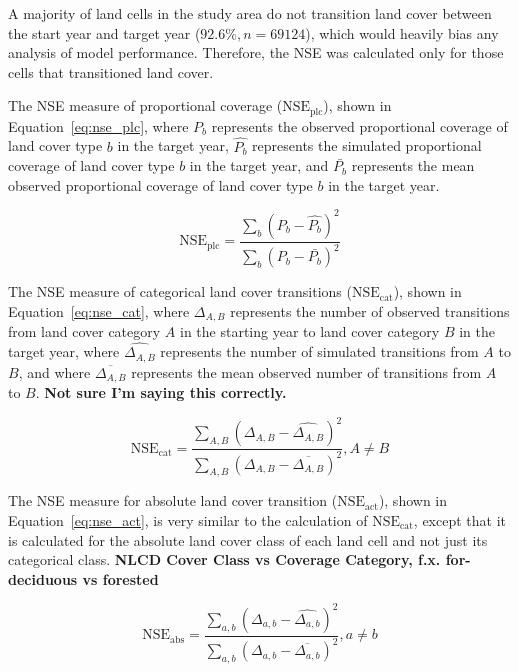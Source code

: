 A majority of land cells in the study area do not transition land cover
between the start year and target year ($92.6\%, n=69124$),
which would heavily bias any analysis of model performance.
Therefore, the NSE was calculated only for those cells that transitioned
land cover.

The NSE measure of proportional coverage ($\text{NSE}_\text{plc}$),
shown in Equation~\ref{eq:nse_plc},
where $P_b$ represents the observed proportional coverage of land cover
type $b$ in the target year,
$\hat{P_b}$ represents the simulated proportional coverage of land cover
type $b$ in the target year,
and $\bar{P_b}$ represents the mean observed proportional coverage of
land cover type $b$ in the target year.

\begin{equation}
    \label{eq:nse_plc}
    \text{NSE}_{\text{plc}} 
    = \frac{\sum_b\left(P_b - \hat{P_b}\right)^2}
        {\sum_b\left(P_b-\bar{P_b}\right)^2}
\end{equation}

The NSE measure of categorical land cover transitions ($\text{NSE}_\text{cat}$),
shown in Equation~\ref{eq:nse_cat},
where $\Delta_{A,B}$ represents the number of observed transitions
from land cover category $A$ in the starting year to land cover
category $B$ in the target year,
where $\widehat{\Delta_{A,B}}$ represents the number of simulated transitions
from $A$ to $B$,
and where $\overline{\Delta_{A,B}}$ represents the mean observed number of
transitions from $A$ to $B$. \textbf{Not sure I'm saying this correctly.}

\begin{equation}
    \label{eq:nse_cat}
    \text{NSE}_{\text{cat}}
    = \frac{\sum_{A,B}\left(\Delta_{A,B}-\widehat{\Delta_{A,B}}\right)^2}
        {\sum_{A,B}\left(\Delta_{A,B}-\overline{\Delta_{A,B}}\right)^2},
    A \ne B
\end{equation}

The NSE measure for absolute land cover transition ($\text{NSE}_\text{act}$),
shown in Equation~\ref{eq:nse_act},
is very similar to the calculation of $\text{NSE}_\text{cat}$,
except that it is calculated for the absolute land cover class of each
land cell and not just its categorical class.
\textbf{NLCD Cover Class vs Coverage Category, f.x. for-deciduous vs forested}

\begin{equation}
    \label{eq:nse_act}
    \text{NSE}_{\text{abs}} 
    =
    \frac{\sum_{a,b}\left(\Delta_{a,b} - \widehat{\Delta_{a,b}}\right)^2}
        {\sum_{a,b}\left(\Delta_{a,b} - \overline{\Delta_{a,b}}\right)^2}
    ,
    a\ne b
\end{equation}

